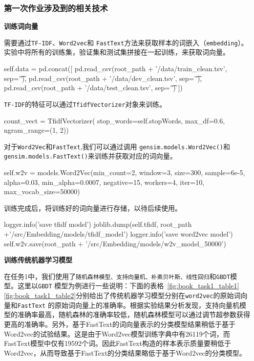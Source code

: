 \subsubsection{第一次作业涉及到的相关技术}

\noindent \textbf{训练词向量}

\noindent 需要通过\texttt{TF-IDF}、\texttt{Word2vec}和 \texttt{FastText}方法来获取样本的词嵌入（\texttt{embedding}）。实验中将所有的训练集，验证集和测试集拼接在一起训练，来获取词向量。
\begin{python}
self.data = pd.concat([
    pd.read_csv(root_path + '/data/train_clean.tsv', sep='\t'),
    pd.read_csv(root_path + '/data/dev_clean.tsv', sep='\t'),
    pd.read_csv(root_path + '/data/test_clean.tsv', sep='\t')
])
\end{python}

\noindent \texttt{TF-IDF}的特征可以通过\texttt{TfidfVectorizer}对象来训练。

\begin{python}
count_vect = TfidfVectorizer(
            stop_words=self.stopWords, max_df=0.6, ngram_range=(1, 2))
\end{python}


\noindent 对于\texttt{Word2Vec}和\texttt{FastText},我们可以通过调用 \texttt{gensim.models.Word2Vec()}和 \texttt{gensim.models.FastText()}来训练并获取对应的词向量。

\begin{python}
self.w2v = models.Word2Vec(min_count=2,
                            window=3,
                            size=300,
                            sample=6e-5,
                            alpha=0.03,
                            min_alpha=0.0007,
                            negative=15,
                            workers=4,
                            iter=10,
                            max_vocab_size=50000)
\end{python}

\noindent 训练完成后，将训练好的词向量进行存储，以待后续使用。

\begin{python}
logger.info('save tfidf model')
joblib.dump(self.tfidf, root_path +'/src/Embedding/models/tfidf_model')
logger.info('save word2vec model')
self.w2v.save(root_path + '/src/Embedding/models/w2v_model_50000')
\end{python}


\noindent\textbf{训练传统机器学习模型}

\noindent 在任务1中，我们使用了\texttt{随机森林模型、支持向量机、朴素贝叶斯、线性回归}和\texttt{GBDT}模型。这里以\texttt{GBDT} 模型为例进行一些说明：下面的表格~\ref{fig:book_task1_table1}\ref{fig:book_task1_table2}分别给出了传统机器学习模型分别在\texttt{word2vec}的原始词向量和\texttt{FastText} 的原始词向量上的准确率。根据实验结果分析发现，支持向量机模型的准确率最高，随机森林的准确率较低，随机森林模型可以通过调节超参数获得更高的准确率。另外，基于FastText的词向量表示的分类模型结果稍低于基于Word2vec的试验结果。这是由于Word2vec模型训练字典中有26119个词，而FastText模型中仅有19592个词。因此FastText构造的样本表示质量要稍低于Word2vec，从而导致基于FastText的分类结果略低于基于Word2vec的分类模型。

